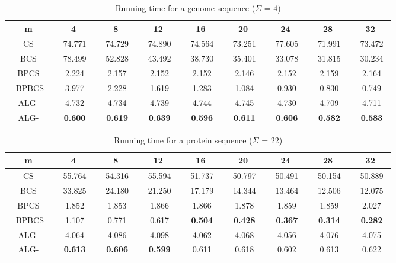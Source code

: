 \documentclass{llncs}
\newcommand{\rom}[1]{\uppercase\expandafter{\romannumeral #1\relax}}
\begin{document}
{\begin{table}
\begin{center}
\begin{tabular}{|c|c|c|c|c|c|c|c|c|}
\hline
m&4&8&12&16&20&24&28&32\\
\hline
CS &~ 74.771~ &~ 74.729~ &~ 74.890~ &~ 74.564~ &~ 73.251~ &~ 77.605~ &~ 71.991~ &~ 73.472~ \\
\hline
BCS &~ 78.499~ &~ 52.828~ &~ 43.492~ &~ 38.730~ &~ 35.401~ &~ 33.078~ &~ 31.815~ &~ 30.234~ \\
\hline
BPCS &~ 2.224~ &~ 2.157~ &~ 2.152~ &~ 2.152~ &~ 2.146~ &~ 2.152~ &~ 2.159~ &~ 2.164~ \\
\hline
~ BPBCS~ &~ 3.977~ &~ 2.228~ &~ 1.619~ &~ 1.283~ &~ 1.084~ &~ 0.930~ &~ 0.830~ &~ 0.749~ \\
\hline
ALG-\rom{2} &~ 4.732~ &~ 4.734~ &~ 4.739~ &~ 4.744~ &~ 4.745~ &~ 4.730~ &~ 4.709~ &~ 4.711~ \\
\hline
ALG-\rom{1} &~ \textbf{0.600}~ &~ \textbf{0.619}~ &~ \textbf{0.639}~ &~ \textbf{0.596}~ &~ \textbf{0.611}~ &~ \textbf{0.606}~ &~ \textbf{0.582}~ &~ \textbf{0.583}~ \\
\hline
\end{tabular}
\caption{Running time for a genome sequence ($\Sigma$ = $4$)} \label{genome}
\end{center}
\end{table}


\begin{table}
\begin{center}
\begin{tabular}{|c|c|c|c|c|c|c|c|c|}
\hline
m&4&8&12&16&20&24&28&32\\
\hline
CS &~ 55.764~ &~ 54.316~ &~ 55.594~ &~ 51.737~ &~ 50.797~ &~ 50.491~ &~ 50.154~ &~ 50.889~ \\
\hline
BCS &~ 33.825~ &~ 24.180~ &~ 21.250~ &~ 17.179~ &~ 14.344~ &~ 13.464~ &~ 12.506~ &~ 12.075~ \\
\hline
BPCS &~ 1.852~ &~ 1.853~ &~ 1.866~ &~ 1.866~ &~ 1.878~ &~ 1.859~ &~ 1.859~ &~ 2.027~ \\
\hline
~ BPBCS~ &~ 1.107~ &~ 0.771~ &~ 0.617~ &~ \textbf{0.504}~ &~ \textbf{0.428}~ &~ \textbf{0.367}~ &~ \textbf{0.314}~ &~ \textbf{0.282}~ \\
\hline
ALG-\rom{2} &~ 4.064~ &~ 4.086~ &~ 4.098~ &~ 4.062~ &~ 4.068~ &~ 4.056~ &~ 4.076~ &~ 4.075~ \\
\hline
ALG-\rom{1} &~ \textbf{0.613}~ &~ \textbf{0.606}~ &~ \textbf{0.599}~ &~ 0.611~ &~ 0.618~ &~ 0.602~ &~ 0.613~ &~ 0.622~ \\
\hline
\end{tabular}
\caption{Running time for a protein sequence ($\Sigma$ = $22$)} \label{protein}
\end{center}
\end{table}


}
\end{document}
